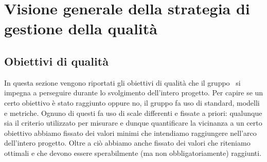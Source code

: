 \documentclass[../PianoDiQualifica.tex]{subfiles}
\begin{document}
\section{Visione generale della strategia di gestione della qualità}
	\subsection{Obiettivi di qualità}
	In questa sezione vengono riportati gli obiettivi di qualità che il gruppo \leaf\ si impegna a perseguire durante lo svolgimento dell'intero progetto. Per capire se un certo obiettivo è stato raggiunto oppure no, il gruppo fa uso di standard, modelli e metriche. Ognuno di questi fa uso di scale differenti e fissate a priori: qualunque sia il criterio utilizzato per misurare e dunque quantificare la vicinanza a un certo obiettivo abbiamo fissato dei valori minimi che intendiamo raggiungere nell'arco dell'intero progetto. Oltre a ciò abbiamo anche fissato dei valori che riteniamo ottimali e che devono essere sperabilmente (ma non obbligatoriamente) raggiunti.
\end{document}
